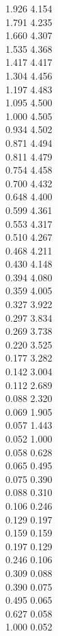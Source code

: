 \documentclass{article}
\begin{document}
{  1.926 4.154 \\ 1.791 4.235 \\ 1.660 4.307 \\ 1.535 4.368 \\ 1.417 4.417 \\ 1.304 4.456 \\ 1.197 4.483 \\ 1.095 4.500 \\
  1.000 4.505 \\ 0.934 4.502 \\ 0.871 4.494 \\ 0.811 4.479 \\ 0.754 4.458 \\ 0.700 4.432 \\ 0.648 4.400 \\ 0.599 4.361 \\
  0.553 4.317 \\ 0.510 4.267 \\ 0.468 4.211 \\ 0.430 4.148 \\ 0.394 4.080 \\ 0.359 4.005 \\ 0.327 3.922 \\ 0.297 3.834 \\
  0.269 3.738 \\ 0.220 3.525 \\ 0.177 3.282 \\ 0.142 3.004 \\ 0.112 2.689 \\ 0.088 2.320 \\ 0.069 1.905 \\ 0.057 1.443 \\
  0.052 1.000 \\ 0.058 0.628 \\ 0.065 0.495 \\ 0.075 0.390 \\ 0.088 0.310 \\ 0.106 0.246 \\ 0.129 0.197 \\ 0.159 0.159 \\
  0.197 0.129 \\ 0.246 0.106 \\ 0.309 0.088 \\ 0.390 0.075 \\ 0.495 0.065 \\ 0.627 0.058 \\ 1.000 0.052 \\
}\curvaxyeD%
\end{document}
